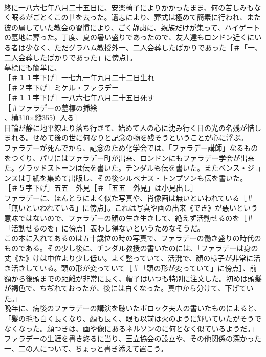 \documentclass[8pt]{extreport}
\begin{document}
\begin{CJK}{UTF8}{min}
\\	終に一八六七年八月二十五日に、安楽椅子によりかかったまま、何の苦しみもなく眠るがごとくこの世を去った。遺志により、葬式は極めて簡素に行われ、また彼の属していた教会の習慣により、ごく静粛に、親族だけが集って、ハイゲートの墓地に葬った。丁度、夏の暑い盛りであったので、友人達もロンドン近くにいる者は少なく、ただグラハム教授外一、二人会葬したばかりであった［＃「一、二人会葬したばかりであった」に傍点］。
\\	墓標にも簡単に、
\\	［＃１１字下げ］一七九一年九月二十二日生れ
\\	［＃２字下げ］ミケル・ファラデー
\\	［＃１１字下げ］一八六七年八月二十五日死す
\\	［＃ファラデーの墓標の挿絵
\\	、横310×縦355）入る］
\\	日輪が静に地平線より落ち行きて、始めて人の心に沈み行く日の光の名残が惜しまれる。せめて後の世に何なりと記念の物を残そうということが心に浮ぶ。
\\	ファラデーが死んでから、記念のため化学会では、「ファラデー講師」なるものをつくり、パリにはファラデー町が出来、ロンドンにもファラデー学会が出来た。グラッドストーンは伝を書いた。チンダルも伝を書いた。またベンス・ジョンスは手紙を集めて出版し、その後シルベナス・トンプソンも伝を書いた。
\\	［＃５字下げ］五五　外見［＃「五五　外見」は小見出し］
\\	ファラデーに、ほんとうによく似た写真や、肖像画は無いといわれている［＃「無いといわれている」に傍点］。これは写真や画の出来《でき》が悪いという意味ではないので、ファラデーの顔の生き生きして、絶えず活動せるのを［＃「活動せるのを」に傍点］表わし得ないというためなそうだ。
\\	この本に入れてあるのは五十歳位の時の写真で、ファラデーの働き盛りの時代のものである。その少し後に、チンダル教授の書いたのには、「ファラデーは身の丈《た》けは中位より少し低い。よく整っていて、活溌で、顔の様子が非常に活き活きしている。頭の形が変っていて［＃「頭の形が変っていて」に傍点］、前額から後頭までの距離が非常に長く、帽子はいつも特別に注文した。初めは頭髪が褐色で、ちぢれておったが、後には白くなった。真中から分けて、下げていた。」
\\	晩年に、病後のファラデーの講演を聴いたポロック夫人の書いたものによると、「髪の毛も白く長くなり、顔も長く、眼も以前は火のように輝いていたがそうでなくなった。顔つきは、画や像にあるネルソンのに何となく似ているようだ。」
\\	ファラデーの生涯を書き終るに当り、王立協会の設立や、その他関係の深かった一、二の人について、ちょっと書き添えて置こう。

\end{CJK}
\end{document}
